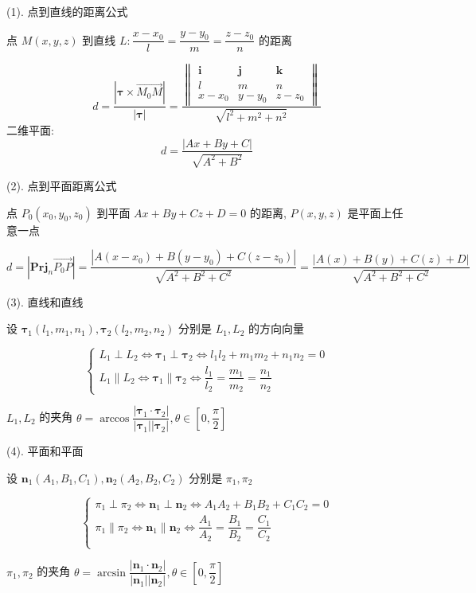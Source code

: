\begin{theorem}[位置关系]

	(1). 点到直线的距离公式

	点 $M(x, y, z)$ 到直线 $L: \dfrac{x-x_{0}}{l} = \dfrac{y-y_{0}}{m} = \dfrac{z-z_{0}}{n}$ 的距离

	$$d=\dfrac{|\boldsymbol{\tau}\times \overrightarrow{M_{0}M}|}{|\boldsymbol{\tau}|} = \dfrac{\begin{Vmatrix}
		\boldsymbol{i} & \boldsymbol{j} & \boldsymbol{k} \\
		l & m & n \\
		x-x_{0} & y-y_{0} & z-z_{0}
	\end{Vmatrix}}{\sqrt{l^2+m^2+n^2}}$$
	二维平面: $$d = \dfrac{|Ax + By + C |}{\sqrt{A^{2}+B^{2}}}$$
	
	(2). 点到平面距离公式

	点 $P_{0}(x_{0}, y_{0}, z_{0})$ 到平面 $Ax+By+Cz+D=0$ 的距离, $P(x,y,z)$ 是平面上任意一点

	$$d = |\textbf{Prj}_{n}\overrightarrow{P_{0}P}| = \dfrac{|A(x-x_{0})+B(y-y_{0})+C(z-z_{0})|}{\sqrt{A^{2}+B^{2}+C^{2}}} = \dfrac{|A(x)+B(y)+C(z)+D|}{\sqrt{A^{2}+B^{2}+C^{2}}}{}$$

	(3). 直线和直线

	设 $\boldsymbol{\tau}_{1}(l_{1},m_{1},n_{1}), \boldsymbol{\tau}_{2}(l_{2},m_{2},n_{2})$ 分别是 $L_{1}, L_{2}$ 的方向向量

	$$\begin{cases}
		L_{1} \perp L_{2}\Leftrightarrow \boldsymbol{\tau}_{1} \perp \boldsymbol{\tau}_{2}\Leftrightarrow l_{1}l_{2}+m_{1}m_{2}+n_{1}n_{2}=0\\
		L_{1} \parallel L_{2}\Leftrightarrow \boldsymbol{\tau}_{1} \parallel \boldsymbol{\tau}_{2}\Leftrightarrow \dfrac{l_{1}}{l_{2}} = \dfrac{m_{1}}{m_{2}} = \dfrac{n_{1}}{n_{2}}
	\end{cases}$$

	$L_{1}, L_{2}$ 的夹角 $\theta = \arccos \dfrac{|\boldsymbol{\tau}_{1}\cdot\boldsymbol{\tau}_{2}|}{|\boldsymbol{\tau}_{1}||\boldsymbol{\tau}_{2}|}, \theta \in [0, \dfrac{\pi}{2}]$

	(4). 平面和平面

	设 $\boldsymbol{n}_{1}(A_{1},B_{1},C_{1}), \boldsymbol{n}_{2}(A_{2},B_{2},C_{2})$ 分别是 $\pi_{1}, \pi_{2}$ 
	
	$$\begin{cases}
		\pi_{1} \perp \pi_{2}\Leftrightarrow \boldsymbol{n}_{1} \perp \boldsymbol{n}_{2}\Leftrightarrow A_{1}A_{2}+B_{1}B_{2}+C_{1}C_{2}=0\\
		\pi_{1} \parallel \pi_{2}\Leftrightarrow \boldsymbol{n}_{1} \parallel \boldsymbol{n}_{2}\Leftrightarrow \dfrac{A_{1}}{A_{2}} = \dfrac{B_{1}}{B_{2}} = \dfrac{C_{1}}{C_{2}}\\
	\end{cases}$$

	$\pi_{1}, \pi_{2}$ 的夹角 $\theta = \arcsin \dfrac{|\boldsymbol{n}_{1}\cdot\boldsymbol{n}_{2}|}{|\boldsymbol{n}_{1}||\boldsymbol{n}_{2}|}, \theta\in[0,\dfrac{\pi}{2}]$
\end{theorem}

